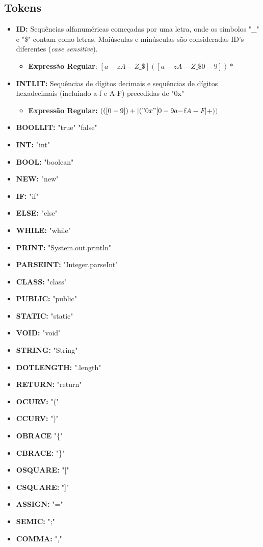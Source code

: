 \documentclass[12pt]{article}
\begin{document}
\subsection{Tokens}
\begin{itemize}
	        \item \textbf{ID:} Sequências alfanuméricas começadas por uma letra, onde os símbolos "\_" e "\$" contam como letras. Maiúsculas e minúsculas são consideradas ID's diferentes (\emph{case sensitive}).
	        \begin{itemize}
				\item \textbf{Expressão Regular}: $[a-zA-Z\_\$]([a-zA-Z\_\$0-9])* $
	        \end{itemize}
	         
	        \item \textbf{INTLIT:} Sequências de dígitos decimais e sequências de dígitos hexadecimais (incluindo a-f e A-F) precedidas de "0x"
	        \begin{itemize}
	        	\item \textbf{Expressão Regular:}  $(([0-9])+|("0x"[0-9a-$f$A-F]+))$  
	        \end{itemize}
	        \item \textbf{BOOLLIT:} "true" \text{\textbar} "false" 
	        \item \textbf{INT:} "int"
	        \item \textbf{BOOL:} "boolean"
	        \item \textbf{NEW:} "new"
	        \item \textbf{IF:} "if"
	        \item \textbf{ELSE:} "else"
	        \item \textbf{WHILE:} "while"
	        \item \textbf{PRINT:} "System.out.println"
	        \item \textbf{PARSEINT:} "Integer.parseInt"
	        \item \textbf{CLASS:} "class"
	        \item \textbf{PUBLIC:} "public"
	        \item \textbf{STATIC:} "static"
	        \item \textbf{VOID:} "void"
	        \item \textbf{STRING:} "String"
	        \item \textbf{DOTLENGTH:} ".length"
	        \item \textbf{RETURN:} "return"
	        \item \textbf{OCURV:} "("
	        \item \textbf{CCURV:} ")"
	        \item \textbf{OBRACE} "\{"
	        \item \textbf{CBRACE:} "\}"
	        \item \textbf{OSQUARE:} "["
	        \item \textbf{CSQUARE:} "]"	 
	        \item \textbf{ASSIGN:} "="
	        \item \textbf{SEMIC:} ";"
	        \item \textbf{COMMA:} ","
	      \end{itemize}
	      
\end{document}

